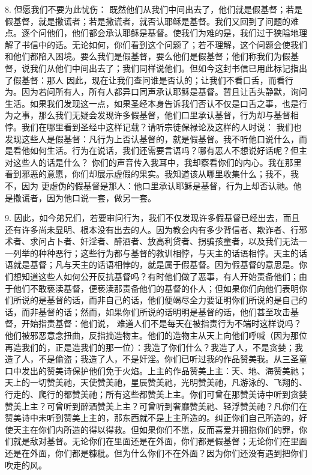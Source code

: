 8. 但愿我们不要为此忧伤：  既然他们从我们中间出去了，他们就是假基督；若是假基督，就是撒谎者；若是撒谎者，就否认耶稣是基督。我们又回到了问题的难点。逐个问他们，他们都会承认耶稣是基督。使我们为难的是，我们过于狭隘地理解了书信中的话。无论如何，你们看到这个问题了；若不理解，这个问题会使我们和他们都陷入困境。要么我们是假基督，要么他们是假基督；他们称我们为假基督，说我们从他们中间出去了；我们同样说他们。但如今这封书信已用此标记指出了假基督：那人 因此，现在让我们查问谁是否认的；让我们不看口舌，而看行为。因为若问所有人，所有人都异口同声承认耶稣是基督。暂且让舌头静默，询问生活。如果我们发现这一点，如果圣经本身告诉我们否认不仅是口舌之事，也是行为之事，那么我们无疑会发现许多假基督，他们口里承认基督，行为却与基督相悖。我们在哪里看到圣经中这样记载？请听宗徒保禄论及这样的人时说：  我们也发现这些人是假基督：凡行为上否认基督的，就是假基督。我不听他口说什么，而是看他如何生活。行为在说话，我们还需要言语吗？哪有恶人不想说好话呢？但主对这些人的话是什么？  你们的声音传入我耳中，我却察看你们的内心。我在那里看到邪恶的意愿，你们却展示虚假的果实。我知道该从哪里收集什么；我不，我不，因为  更虚伪的假基督是那人：他口里承认耶稣是基督，行为上却否认祂。他是撒谎者，因为他口说一套，做另一套。\par

9. 因此，如今弟兄们，若要审问行为，我们不仅发现许多假基督已经出去，而且还有许多尚未显明、根本没有出去的人。因为教会内有多少背信者、欺诈者、行邪术者、求问占卜者、奸淫者、醉酒者、放高利贷者、拐骗孩童者，以及我们无法一一列举的种种恶行；这些行为都与基督的教训相悖，与天主的话语相悖。天主的话语就是基督；凡与天主的话语相悖的，就是属于假基督。因为假基督的意思是。你们想知道这些人如何公开反抗基督吗？有时他们做了恶事，有人开始责备他们；由于他们不敢亵渎基督，便亵渎那责备他们的基督的仆人；但如果你们向他们表明你们所说的是基督的话，而非自己的话，他们便竭尽全力要证明你们所说的是自己的话，而非基督的话；然而，如果你们所说的话明明是基督的话，他们甚至攻击基督，开始指责基督：他们说， 难道人们不是每天在被指责行为不端时这样说吗？他们被邪恶意念扭曲，反指摘造物主。他们的造物主从天上向他们呼喊（因为那位再造我们的，正是造我们的那一位）：我造了你们什么？我造了人，不是贪婪；我造了人，不是偷盗；我造了人，不是奸淫。你们已听过我的作品赞美我。从三圣童口中发出的赞美诗保护他们免于火焰。上主的作品赞美上主：天、地、海赞美祂；天上的一切赞美祂，天使赞美祂，星辰赞美祂，光明赞美祂，凡游泳的、飞翔的、行走的、爬行的都赞美祂；所有这些都赞美上主。你们可曾在那赞美诗中听到贪婪赞美上主？可曾听到醉酒赞美上主？可曾听到奢靡赞美祂、轻浮赞美祂？凡你们在赞美诗中未听到赞美上主的，那东西就不是上主所造的。纠正你们自己所造的，好使天主在你们内所造的得以得救。但如果你们不愿，反而喜爱并拥抱你们的罪，你们就是敌对基督。无论你们在里面还是在外面，你们都是假基督；无论你们在里面还是在外面，你们都是糠秕。但为什么你们不在外面？因为你们还没有遇到把你们吹走的风。\par

